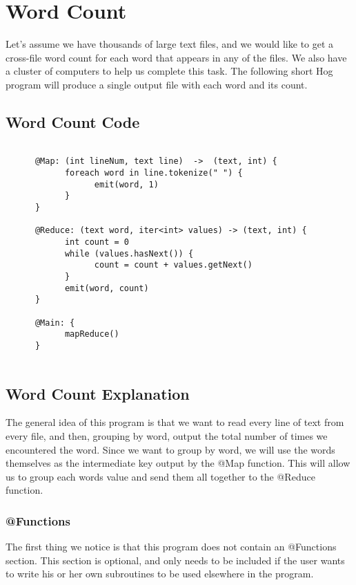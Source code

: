 \documentclass{article} \usepackage{fancyhdr, multicol}
\begin{document}
\section*{Word Count}
\label{word_count}
Let's assume we have thousands of large text files, and we would like to get a cross-file word count for each word that appears in any of the files. We also have a cluster of computers to help us complete this task. The following short Hog program will produce a single output file with each word and its count.

\subsection*{Word Count Code}
\begin{verbatim}
      
      @Map: (int lineNum, text line)  ->  (text, int) {
            foreach word in line.tokenize(" ") {
                  emit(word, 1)
            }
      }
      
      @Reduce: (text word, iter<int> values) -> (text, int) {
            int count = 0
            while (values.hasNext()) {
                  count = count + values.getNext()
            }
            emit(word, count)
      }
      
      @Main: {
            mapReduce()
      }
      
\end{verbatim}

\subsection*{Word Count Explanation}
The general idea of this program is that we want to read every line of text from every file, and then, grouping by word, output the total number of times we encountered the word. Since we want to group by word, we will use the words themselves as the intermediate key output by the @Map function. This will allow us to group each words value and send them all together to the @Reduce function.

\subsubsection*{@Functions}
The first thing we notice is that this program does not contain an @Functions section. This section is optional, and only needs to be included if the user wants to write his or her own subroutines to be used elsewhere in the program.
\end{document}
